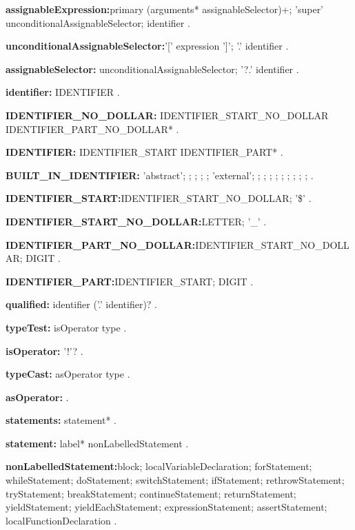 \begin{grammar}

{\bf assignableExpression:}primary (arguments* assignableSelector)+;
      'super' unconditionalAssignableSelector;
      identifier
    .
    
{\bf unconditionalAssignableSelector:}'[' expression ']'; %
         '.' identifier
    .

{\bf assignableSelector:}
         unconditionalAssignableSelector;
         '?.' identifier
    .

\end{grammar}
\begin{grammar}
{\bf identifier:}
     IDENTIFIER
     .
     
         
 {\bf IDENTIFIER_NO_DOLLAR:}
      IDENTIFIER_START_NO_DOLLAR IDENTIFIER_PART_NO_DOLLAR*
    .

{\bf IDENTIFIER:}
      IDENTIFIER_START IDENTIFIER_PART*
    .

{\bf BUILT_IN_IDENTIFIER:} 'abstract';
     \AS{};
     \DEFERRED{};
     \DYNAMIC{};
     \EXPORT{};
     'external';
     \FACTORY{};
     \GET{};
     \IMPLEMENTS{};
     \IMPORT{};
     \LIBRARY{};
     \OPERATOR{};
     \PART{};
      \SET{};
      \STATIC{};
     \TYPEDEF{}
    .

 {\bf IDENTIFIER_START:}IDENTIFIER_START_NO_DOLLAR;
      '\$'
    .

{\bf IDENTIFIER_START_NO_DOLLAR:}LETTER;
      '_'
    .

{\bf  IDENTIFIER_PART_NO_DOLLAR:}IDENTIFIER_START_NO_DOLLAR;
      DIGIT
    .


{\bf IDENTIFIER_PART:}IDENTIFIER_START;
      DIGIT
    .



{\bf qualified:}
      identifier ('.' identifier)?  
      . 
\end{grammar}
\begin{grammar}
 {\bf typeTest:}
 isOperator type
 .
 
 
{\bf isOperator:}
\IS{} '!'?
    .
 \end{grammar}
\begin{grammar}
 {\bf typeCast:}
 asOperator type
 .
 
 
{\bf asOperator:}
\AS{}
    .
 \end{grammar}
\begin{grammar}
{\bf statements:}
      statement*
    .


{\bf statement:}
      label* nonLabelledStatement
    .

{\bf nonLabelledStatement:}block; 
      localVariableDeclaration;
      forStatement;
      whileStatement;
      doStatement;
      switchStatement;
      ifStatement;
      rethrowStatement;
      tryStatement;
      breakStatement;
      continueStatement;
      returnStatement;
      yieldStatement;
      yieldEachStatement;
      expressionStatement;
      assertStatement;
      localFunctionDeclaration
    .
 \end{grammar}
